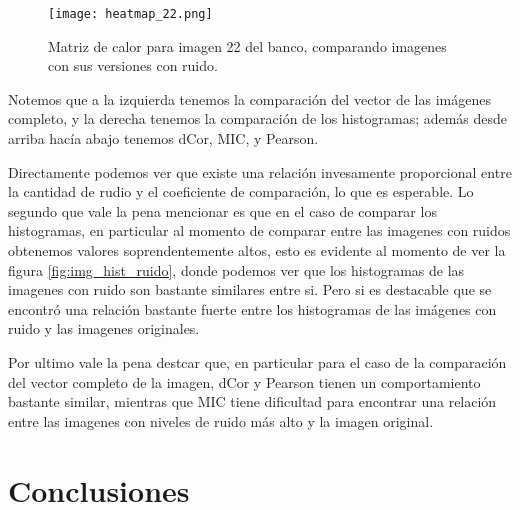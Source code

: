 \begin{figure}[H]
    \centering
    \texttt{[image: heatmap\_22.png]}
    \caption{Matriz de calor para imagen 22 del banco, comparando imagenes con sus versiones con ruido.}
    \label{fig:heatmap22}
\end{figure}

Notemos que a la izquierda tenemos la comparaci\'on del vector de las im\'agenes completo, y la derecha tenemos la comparaci\'on de los histogramas; además desde arriba hac\'ia abajo tenemos dCor, MIC, y Pearson.

Directamente podemos ver que existe una relaci\'on invesamente proporcional entre la cantidad de rudio y el coeficiente de comparaci\'on, lo que es esperable. Lo segundo que vale la pena mencionar es que en el caso de comparar los histogramas, en particular al momento de comparar entre las imagenes con ruidos obtenemos valores soprendentemente altos, esto es evidente al momento de ver la figura \ref{fig:img_hist_ruido}, donde podemos ver que los histogramas de las imagenes con ruido son bastante similares entre si. Pero si es destacable que se encontró una relaci\'on bastante fuerte entre los histogramas de las im\'agenes con ruido y las imagenes originales. 


Por ultimo vale la pena destcar que, en particular para el caso de la comparaci\'on del vector completo de la imagen, dCor y Pearson tienen un comportamiento bastante similar, mientras que MIC tiene dificultad para encontrar una relaci\'on entre las imagenes con niveles de ruido m\'as alto y la imagen original. 


\section{Conclusiones}



